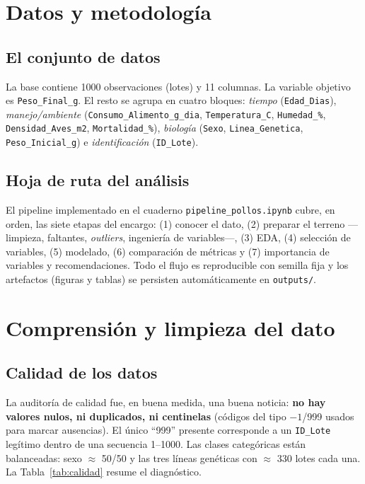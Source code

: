 \documentclass[11pt,a4paper]{article}
\begin{document}
\section{Datos y metodología}

\subsection{El conjunto de datos}
La base contiene \num{1000} observaciones (lotes) y \num{11} columnas. La variable objetivo es
\texttt{Peso\_Final\_g}. El resto se agrupa en cuatro bloques: \emph{tiempo} (\texttt{Edad\_Dias}),
\emph{manejo/ambiente} (\texttt{Consumo\_Alimento\_g\_dia}, \texttt{Temperatura\_C},
\texttt{Humedad\_\%}, \texttt{Densidad\_Aves\_m2}, \texttt{Mortalidad\_\%}), \emph{biología}
(\texttt{Sexo}, \texttt{Linea\_Genetica}, \texttt{Peso\_Inicial\_g}) e \emph{identificación}
(\texttt{ID\_Lote}).

\subsection{Hoja de ruta del análisis}
El pipeline implementado en el cuaderno \texttt{pipeline\_pollos.ipynb} cubre, en orden, las siete etapas
del encargo: (1) conocer el dato, (2) preparar el terreno —limpieza, faltantes, \emph{outliers},
ingeniería de variables—, (3) EDA, (4) selección de variables, (5) modelado, (6) comparación de
métricas y (7) importancia de variables y recomendaciones. Todo el flujo es reproducible con semilla
fija y los artefactos (figuras y tablas) se persisten automáticamente en \texttt{outputs/}.

\section{Comprensión y limpieza del dato}

\subsection{Calidad de los datos}
La auditoría de calidad fue, en buena medida, una buena noticia: \textbf{no hay valores nulos, ni
duplicados, ni centinelas} (códigos del tipo $-1$/\num{999} usados para marcar ausencias). El único
``\num{999}'' presente corresponde a un \texttt{ID\_Lote} legítimo dentro de una secuencia
\numrange{1}{1000}. Las clases categóricas están balanceadas: sexo $\approx$ 50/50 y las tres líneas
genéticas con $\approx$ 330 lotes cada una. La Tabla~\ref{tab:calidad} resume el diagnóstico.
\end{document}
